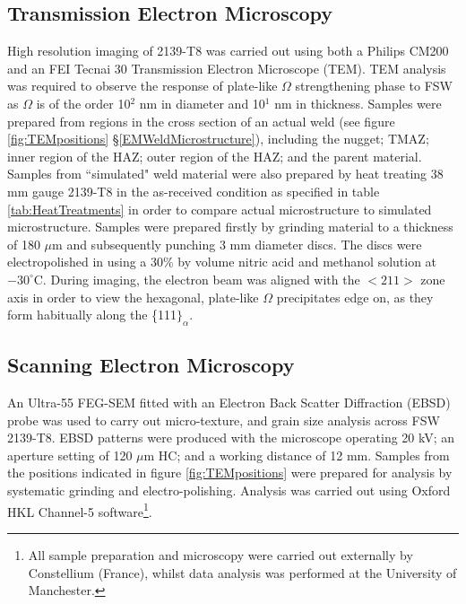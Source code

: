 	\subsection{Transmission Electron Microscopy}
	\label{EMTem}
	High resolution imaging of 2139-T8 was carried out using both a Philips CM200 and an FEI Tecnai 30 Transmission Electron Microscope (TEM). TEM analysis was required to observe the response of plate-like $\Omega$ strengthening phase to FSW as $\Omega$ is of the order 10$^2$ nm in diameter and 10$^1$ nm in thickness. Samples were prepared from regions in the cross section of an actual weld (see figure \ref{fig:TEMpositions} \S\ref{EMWeldMicrostructure}), including the nugget; TMAZ; inner region of the HAZ; outer region of the HAZ; and the parent material. Samples from ``simulated" weld material were also prepared by heat treating 38 mm gauge 2139-T8 in the as-received condition as specified in table \ref{tab:HeatTreatments} in order to compare actual microstructure to simulated microstructure. Samples were prepared firstly by grinding material to a thickness of 180 $\mu$m and subsequently punching 3 mm diameter discs. The discs were electropolished in using a 30\% by volume nitric acid and methanol solution at $-30^\circ$C. During imaging, the electron beam was aligned with the $<\!211\!>$ zone axis in order to view the hexagonal, plate-like $\Omega$ precipitates edge on, as they form habitually along the \{111$\}_\alpha$.
	\subsection{Scanning Electron Microscopy}
	\label{EMSem}
	An Ultra-55 FEG-SEM fitted with an Electron Back Scatter Diffraction (EBSD) probe was used to carry out micro-texture, and grain size analysis across FSW 2139-T8. EBSD patterns were produced with the microscope operating 20 kV; an aperture setting of 120 $\mu$m HC; and a working distance of 12 mm. Samples from the positions indicated in figure \ref{fig:TEMpositions} were prepared for analysis by systematic grinding and electro-polishing. Analysis was carried out using Oxford HKL Channel-5 software\footnote{All sample preparation and microscopy were carried out externally by Constellium (France), whilst data analysis was performed at the University of Manchester.}.
	
